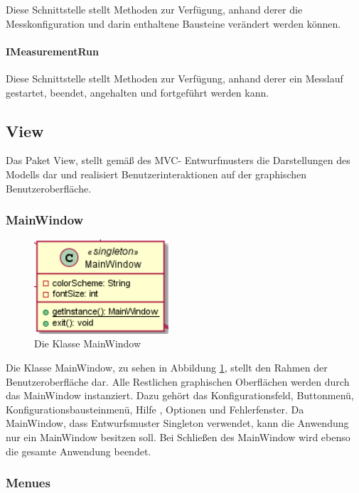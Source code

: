 \documentclass[parskip=full]{scrartcl}
\begin{document}
Diese Schnittstelle stellt Methoden zur Verfügung, anhand derer die Messkonfiguration und darin enthaltene Bausteine verändert werden können.

\paragraph{IMeasurementRun}

Diese Schnittstelle stellt Methoden zur Verfügung, anhand derer ein Messlauf gestartet, beendet, angehalten und fortgeführt werden kann.

\clearpage
\subsection{View}
Das Paket View, stellt gemäß des MVC- Entwurfmusters die Darstellungen des Modells dar und realisiert Benutzerinteraktionen auf der graphischen Benutzeroberfläche. 

\subsubsection{MainWindow} 

\begin{figure}[htbp]
	\begin{center}
		\includegraphics[width = 5cm]{Grafiken/View/MainWindow.png}
		\caption{Die Klasse MainWindow}
		\label{MainWindow}
	\end{center}
\end{figure}

Die Klasse MainWindow, zu sehen in Abbildung \ref{MainWindow}, stellt den Rahmen der Benutzeroberfläche dar. Alle Restlichen graphischen Oberflächen werden durch das MainWindow instanziert. Dazu gehört das Konfigurationsfeld, Buttonmenü, Konfigurationsbausteinmenü, Hilfe , Optionen und Fehlerfenster. 
Da MainWindow, dass Entwurfsmuster Singleton verwendet, kann die Anwendung nur ein MainWindow besitzen soll.
Bei Schließen des MainWindow wird ebenso die gesamte Anwendung beendet.

\newpage

\subsubsection{Menues}
\end{document}

